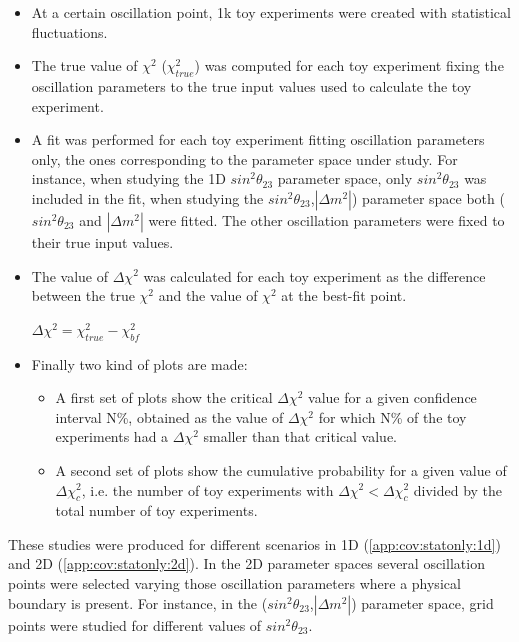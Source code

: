 \begin{itemize}
\item{At a certain oscillation point, 1k toy experiments were created with statistical fluctuations.}
\item{The true value of $\chi^{2}$ ($\chi^{2} _{true}$) was computed for each toy experiment fixing the oscillation parameters to the true input values used to calculate the toy experiment.}
\item{A fit was performed for each toy experiment fitting oscillation parameters only, the ones corresponding to the parameter space under study. For instance, when studying the 1D $sin^{2}\theta_{23}$ parameter space, only $sin^{2}\theta_{23}$ was included in the fit, when studying  the $sin^{2}\theta_{23}$,$|\Delta m^{2}|$) parameter space both ($sin^{2}\theta_{23}$ and $|\Delta m^{2}|$ were fitted. The other oscillation parameters were fixed to their true input values. }
\item{The value of $\Delta\chi^{2}$ was calculated for each toy experiment as the difference between the true $\chi^{2}$ and the value of $\chi^{2}$ at the best-fit point.}
\begin{center}
$\Delta\chi^{2} = \chi^{2} _{true} - \chi^{2}_{bf}$
\end{center}
\item{Finally two kind of plots are made: 
\begin{itemize}
\item{A first set of plots show the critical $\Delta\chi^{2}$ value for a given confidence interval N\%, obtained as the value of $\Delta\chi^{2}$ for which N\% of the toy experiments had a $\Delta\chi^{2}$ smaller than that critical value.}
\item{A second set of plots show the cumulative probability for a given value of $\Delta\chi^{2}_{c}$, i.e. the number of toy experiments with $\Delta\chi^{2} < \Delta\chi^{2}_{c}$ divided by the total number of toy experiments.}
\end{itemize}
}
\end{itemize}

These studies were produced for different scenarios in 1D (\ref{app:cov:statonly:1d}) and 2D (\ref{app:cov:statonly:2d}).
In the 2D parameter spaces several oscillation points were selected varying those oscillation parameters
where a physical boundary is present. For instance, in the ($sin^{2}\theta_{23}$,$|\Delta m^{2}|$) parameter space,
 grid points were studied for different values of $sin^{2}\theta_{23}$.


